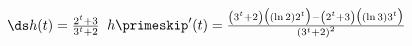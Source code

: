{$\ds h(t) = \frac{2^t+3}{3^t+2}$
}
{$h\primeskip'(t) = \frac{\left(3^t+2\right)\big((\ln 2) 2^t\big)-\left(2^t+3\right)\big((\ln 3)3^t\big)}{\left(3^t+2\right)^2}$
}
